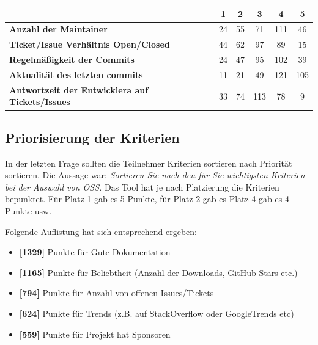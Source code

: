 \begin{table}[h]
    \begin{tabular}{l|c|c|c|c|c|}
                                                                & \textbf{1} & \textbf{2} & \textbf{3} & \textbf{4} & \textbf{5} \\ \hline
        \textbf{Anzahl der Maintainer}                          & 24         & 55         & 71         & 111        & 46         \\ \hline
        \textbf{Ticket/Issue Verhältnis Open/Closed}            & 44         & 62         & 97         & 89         & 15         \\ \hline
        \textbf{Regelmäßigkeit der Commits}                     & 24         & 47         & 95         & 102        & 39         \\ \hline
        \textbf{Aktualität des letzten commits}                 & 11         & 21         & 49         & 121        & 105        \\ \hline
        \textbf{Antwortzeit der Entwicklera auf Tickets/Issues} & 33         & 74         & 113        & 78         & 9          \\ \hline
    \end{tabular}%
\end{table}



\subsection*{Priorisierung der Kriterien}

In der letzten Frage sollten die Teilnehmer Kriterien sortieren nach Priorität sortieren. Die Aussage war:
\textit{Sortieren Sie nach den für Sie wichtigsten Kriterien bei der Auswahl von OSS.}
Das Tool hat je nach Platzierung die Kriterien bepunktet. Für Platz 1 gab es 5 Punkte, für Platz 2 gab es Platz 4 gab es 4 Punkte usw.

Folgende Auflistung hat sich entsprechend ergeben:

\begin{itemize}
    \item \textbf{[1329]} Punkte für Gute Dokumentation
    \item \textbf{[1165]} Punkte für Beliebtheit (Anzahl der Downloads, GitHub Stars etc.)
    \item \textbf{[794]} Punkte für Anzahl von offenen Issues/Tickets
    \item \textbf{[624]} Punkte für Trends (z.B. auf StackOverflow oder GoogleTrends etc)
    \item \textbf{[559]} Punkte für Projekt hat Sponsoren
\end{itemize}
